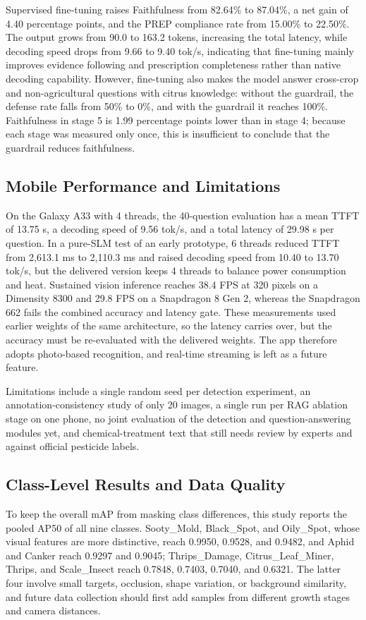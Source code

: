 \documentclass[10pt,twocolumn,a4paper]{article}
\begin{document}
Supervised fine-tuning raises Faithfulness from 82.64\% to 87.04\%, a net gain of 4.40 percentage points, and the PREP compliance rate from 15.00\% to 22.50\%. The output grows from 90.0 to 163.2 tokens, increasing the total latency, while decoding speed drops from 9.66 to 9.40 tok/s, indicating that fine-tuning mainly improves evidence following and prescription completeness rather than native decoding capability. However, fine-tuning also makes the model answer cross-crop and non-agricultural questions with citrus knowledge: without the guardrail, the defense rate falls from 50\% to 0\%, and with the guardrail it reaches 100\%. Faithfulness in stage 5 is 1.99 percentage points lower than in stage 4; because each stage was measured only once, this is insufficient to conclude that the guardrail reduces faithfulness.

\subsection{Mobile Performance and Limitations}
On the Galaxy A33 with 4 threads, the 40-question evaluation has a mean TTFT of 13.75 s, a decoding speed of 9.56 tok/s, and a total latency of 29.98 s per question. In a pure-SLM test of an early prototype, 6 threads reduced TTFT from 2,613.1 ms to 2,110.3 ms and raised decoding speed from 10.40 to 13.70 tok/s, but the delivered version keeps 4 threads to balance power consumption and heat. Sustained vision inference reaches 38.4 FPS at 320 pixels on a Dimensity 8300 and 29.8 FPS on a Snapdragon 8 Gen 2, whereas the Snapdragon 662 fails the combined accuracy and latency gate. These measurements used earlier weights of the same architecture, so the latency carries over, but the accuracy must be re-evaluated with the delivered weights. The app therefore adopts photo-based recognition, and real-time streaming is left as a future feature.

Limitations include a single random seed per detection experiment, an annotation-consistency study of only 20 images, a single run per RAG ablation stage on one phone, no joint evaluation of the detection and question-answering modules yet, and chemical-treatment text that still needs review by experts and against official pesticide labels.

\subsection{Class-Level Results and Data Quality}
To keep the overall mAP from masking class differences, this study reports the pooled AP50 of all nine classes. Sooty\_Mold, Black\_Spot, and Oily\_Spot, whose visual features are more distinctive, reach 0.9950, 0.9528, and 0.9482, and Aphid and Canker reach 0.9297 and 0.9045; Thrips\_Damage, Citrus\_Leaf\_Miner, Thrips, and Scale\_Insect reach 0.7848, 0.7403, 0.7040, and 0.6321. The latter four involve small targets, occlusion, shape variation, or background similarity, and future data collection should first add samples from different growth stages and camera distances.
\end{document}
